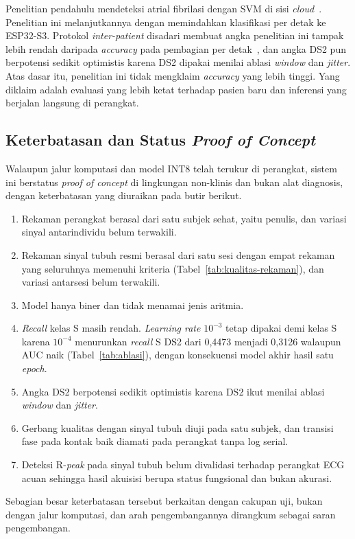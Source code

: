 Penelitian pendahulu mendeteksi atrial fibrilasi dengan SVM di sisi \textit{cloud}~\cite{mulyawan_2026}. Penelitian ini melanjutkannya dengan memindahkan klasifikasi per detak ke ESP32-S3. Protokol \textit{inter-patient} disadari membuat angka penelitian ini tampak lebih rendah daripada \textit{accuracy} pada pembagian per detak~\cite{xiao_2023}, dan angka DS2 pun berpotensi sedikit optimistis karena DS2 dipakai menilai ablasi \textit{window} dan \textit{jitter}. Atas dasar itu, penelitian ini tidak mengklaim \textit{accuracy} yang lebih tinggi. Yang diklaim adalah evaluasi yang lebih ketat terhadap pasien baru dan inferensi yang berjalan langsung di perangkat.

\subsection{Keterbatasan dan Status \textit{Proof of Concept}}

Walaupun jalur komputasi dan model INT8 telah terukur di perangkat, sistem ini berstatus \textit{proof of concept} di lingkungan non-klinis dan bukan alat diagnosis, dengan keterbatasan yang diuraikan pada butir berikut.
\begin{enumerate}
  \item Rekaman perangkat berasal dari satu subjek sehat, yaitu penulis, dan variasi sinyal antarindividu belum terwakili.
  \item Rekaman sinyal tubuh resmi berasal dari satu sesi dengan empat rekaman yang seluruhnya memenuhi kriteria (Tabel~\ref{tab:kualitas-rekaman}), dan variasi antarsesi belum terwakili.
  \item Model hanya biner dan tidak menamai jenis aritmia.
  \item \textit{Recall} kelas S masih rendah. \textit{Learning rate} $10^{-3}$ tetap dipakai demi kelas S karena $10^{-4}$ menurunkan \textit{recall} S DS2 dari 0,4473 menjadi 0,3126 walaupun AUC naik (Tabel~\ref{tab:ablasi}), dengan konsekuensi model akhir hasil satu \textit{epoch}.
  \item Angka DS2 berpotensi sedikit optimistis karena DS2 ikut menilai ablasi \textit{window} dan \textit{jitter}.
  \item Gerbang kualitas dengan sinyal tubuh diuji pada satu subjek, dan transisi fase pada kontak baik diamati pada perangkat tanpa log serial.
  \item Deteksi R-\textit{peak} pada sinyal tubuh belum divalidasi terhadap perangkat ECG acuan sehingga hasil akuisisi berupa status fungsional dan bukan akurasi.
\end{enumerate}

Sebagian besar keterbatasan tersebut berkaitan dengan cakupan uji, bukan dengan jalur komputasi, dan arah pengembangannya dirangkum sebagai saran pengembangan.
